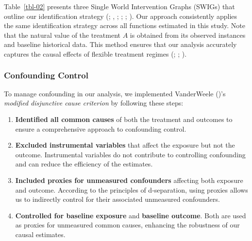\documentclass[
  single column]{article}
\providecommand{\tightlist}{%
  \setlength{\itemsep}{0pt}\setlength{\parskip}{0pt}}\usepackage{longtable,booktabs,array}
\begin{document}
Table~\ref{tbl-02} presents three Single World Intervention Graphs
(SWIGs) that outline our identification strategy
(;
,
;
;
;
). Our
approach consistently applies the same identification strategy across
all functions estimated in this study. Note that the natural value of
the treatment \(A\) is obtained from its observed instances and baseline
historical data. This method ensures that our analysis accurately
captures the causal effects of flexible treatment regimes
(;
;
).

\subsubsection{Confounding Control}\label{confounding-control}

To manage confounding in our analysis, we implemented VanderWeele
()'s \emph{modified disjunctive
cause criterion} by following these steps:

\begin{enumerate}
\def\labelenumi{\arabic{enumi}.}
\tightlist
\item
  \textbf{Identified all common causes} of both the treatment and
  outcomes to ensure a comprehensive approach to confounding control.
\item
  \textbf{Excluded instrumental variables} that affect the exposure but
  not the outcome. Instrumental variables do not contribute to
  controlling confounding and can reduce the efficiency of the
  estimates.
\item
  \textbf{Included proxies for unmeasured confounders} affecting both
  exposure and outcome. According to the principles of d-separation,
  using proxies allows us to indirectly control for their associated
  unmeasured confounders.
\item
  \textbf{Controlled for baseline exposure} and \textbf{baseline
  outcome}. Both are used as proxies for unmeasured common causes,
  enhancing the robustness of our causal estimates.
\end{enumerate}
\end{document}
